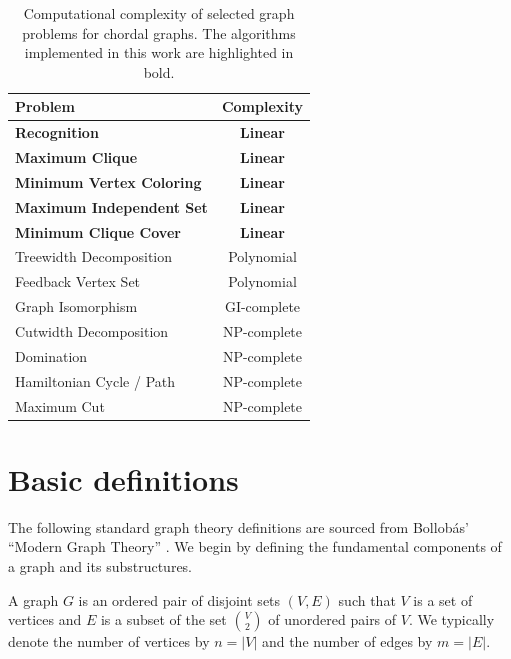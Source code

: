 \begin{table}[h!]
\centering
\begin{tabular}{|l|c|}
\hline
\textbf{Problem} & \textbf{Complexity} \\
\hline
\textbf{Recognition} & \textbf{Linear} \cite{RoseTarjanLueker1976, TarjanYannakakis1984} \\
\textbf{Maximum Clique} & \textbf{Linear} \cite{Gavril1972} \\
\textbf{Minimum Vertex Coloring} & \textbf{Linear} \cite{Gavril1972}  \\
\textbf{Maximum Independent Set} & \textbf{Linear} \cite{Gavril1972} \\
\textbf{Minimum Clique Cover} & \textbf{Linear} \cite{Gavril1972} \\
Treewidth Decomposition & Polynomial \cite{Bodlaender1993} \\
Feedback Vertex Set & Polynomial \cite{Festa2000} \\
Graph Isomorphism & GI-complete \cite{Zemlyachenko1985} \\
Cutwidth Decomposition & NP-complete \cite{Heggernes2008} \\
Domination & NP-complete \cite{BoothJohnson1982} \\
Hamiltonian Cycle / Path & NP-complete \cite{ColbournStewart1985} \\
Maximum Cut & NP-complete \cite{BodlaenderJansen2000} \\
\hline
\end{tabular}
\caption{Computational complexity of selected graph problems for chordal graphs. The algorithms implemented in this work are highlighted in bold.}
\label{tab:chordal_complexity}
\end{table}

\section{Basic definitions}

The following standard graph theory definitions are sourced from Bollobás' ``Modern Graph Theory'' \cite{Bollobas1998}. We begin by defining the fundamental components of a graph and its substructures.

\begin{definition}[Graph]
A graph $G$ is an ordered pair of disjoint sets $(V, E)$ such that $V$ is a set of vertices and $E$ is a subset of the set $\binom{V}{2}$ of unordered pairs of $V$. We typically denote the number of vertices by $n = |V|$ and the number of edges by $m = |E|$.
\end{definition}

